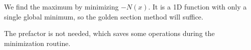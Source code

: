 We find the maximum by minimizing $-N(x)$. It is a 1D function with only a single global minimum, so the golden section method will suffice.

The prefactor is not needed, which saves some operations during the minimization routine.